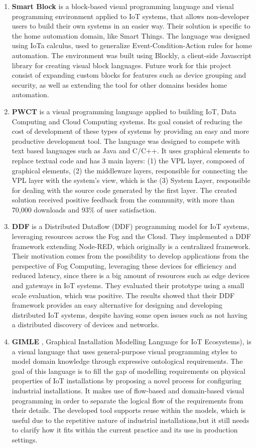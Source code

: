 \begin{enumerate}
    \item \textbf{Smart Block} \cite{smart_block} is a block-based visual programming language and visual programming environment applied to IoT systems, that allows non-developer users to build their own systems in an easier way. Their solution is specific to the home automation domain, like Smart Things. The language was designed using IoTa calculus, used to generalize Event-Condition-Action rules for home automation. The environment was built using Blockly, a client-side Javascript library for creating visual block languages. Future work for this project consist of expanding custom blocks for features such as device grouping and security, as well as extending the tool for other domains besides home automation.
    \item \textbf{PWCT} \cite{pwct} is a visual programming language applied to building IoT, Data Computing and Cloud Computing systems. Its goal consist of reducing the cost of development of these types of systems by providing an easy and more productive development tool. The language was designed to compete with text based languages such as Java and C/C++. It uses graphical elements to replace textual code and has 3 main layers: (1) the VPL layer, composed of graphical elements, (2) the middleware layers, responsible for connecting the VPL layer with the system's view, which is the (3) System Layer, responsible for dealing with the source code generated by the first layer. The created solution received positive feedback from the community, with more than 70,000 downloads and 93\% of user satisfaction.
    \item \textbf{DDF} \cite{ddf} is a Distributed Dataflow (DDF) programming model for IoT systems, leveraging resources across the Fog and the Cloud. They implemented a DDF framework extending Node-RED, which originally is a centralized framework. Their motivation comes from the possibility to develop applications from the perspective of Fog Computing, leveraging these devices for efficiency and reduced latency, since there is a big amount of resources such as edge devices and gateways in IoT systems. They evaluated their prototype using a small scale evaluation, which was positive. The results showed that their DDF framework provides an easy alternative for designing and developing distributed IoT systems, despite having some open issues such as not having a distributed discovery of devices and networks.
    \item \textbf{GIMLE} \cite{gimle}, Graphical Installation Modelling Language for IoT Ecosystems), is a visual language that uses general-purpose visual programming styles to model domain knowledge through expressive ontological requirements. The goal of this language is to fill the gap of modelling requirements on physical properties of IoT installations by proposing a novel process for configuring industrial installations. It makes use of flow-based and domain-based visual programming in order to separate the logical flow of the requirements from their details. The developed tool supports reuse within the models, which is useful due to the repetitive nature of industrial installations,but it still needs to clarify how it fits within the current practice and its use in production settings.

\end{enumerate}
